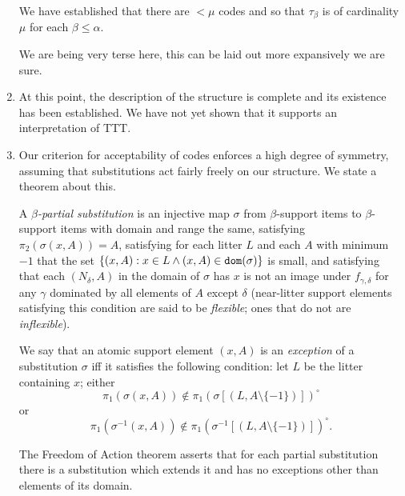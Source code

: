 \documentclass[12pt]{article}
\begin{document}
\begin{enumerate}
We have established that there are $<\mu$ codes and so that $\tau_{\beta}$ is of cardinality $\mu$ for each $\beta\leq \alpha$.

We are being very terse here, this can be laid out more expansively we are sure.

\item  At this point, the description of the structure is complete and its existence has been established.  We have not yet shown that it supports an interpretation of TTT.

\item Our criterion for acceptability of codes enforces a high degree of symmetry, assuming that substitutions act fairly freely on our structure.  We state a theorem about this.

A {\em $\beta$-partial substitution\/} is an injective map $\sigma$ from $\beta$-support items to $\beta$-support items with domain and range the same, satisfying $\pi_2(\sigma(x,A)) = A$, satisfying for each litter $L$ and each $A$ with minimum $-1$ that the set $\{(x,A): x \in L \wedge (x,A) \in {\tt dom}(\sigma)\}$ is small, and satisfying that each $(N_\delta,A)$
in the domain of $\sigma$ has $x$ is not an image under $f_{\gamma,\delta}$ for any $\gamma$ dominated by all elements of $A$ except $\delta$ (near-litter support elements satisfying this condition are said to be {\em flexible\/}; ones that do not are {\em inflexible}).

 We say that an atomic support element $(x,A)$ is an {\em exception\/} of a substitution $\sigma$ iff it satisfies the following condition:
let $L$ be the litter containing $x$; either $$\pi_1(\sigma(x,A)) \not\in \pi_1(\sigma[(L,A \setminus \{-1\})])^\circ$$ or $$\pi_1(\sigma^{-1}(x,A)) \not\in \pi_1(\sigma^{-1}[(L,A \setminus \{-1\})])^\circ.$$

The Freedom of Action theorem asserts that for each partial substitution there is a substitution which extends it and has no exceptions other than elements of its domain.



\end{enumerate}
\end{document}
